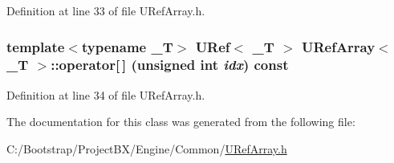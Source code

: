 Definition at line 33 of file URefArray.h.\hypertarget{class_u_ref_array_468a468a3897571297028515744adbad}{
\subsubsection[{operator[]}]{\setlength{\rightskip}{0pt plus 5cm}template$<$typename \_\-T$>$ {\bf URef}$<$ \_\-T $>$ {\bf URefArray}$<$ \_\-T $>$::operator\mbox{[}$\,$\mbox{]} (unsigned int {\em idx}) const}}
\label{class_u_ref_array_468a468a3897571297028515744adbad}




Definition at line 34 of file URefArray.h.

The documentation for this class was generated from the following file:\begin{CompactItemize}
\item 
C:/Bootstrap/ProjectBX/Engine/Common/\hyperlink{_u_ref_array_8h}{URefArray.h}\end{CompactItemize}
